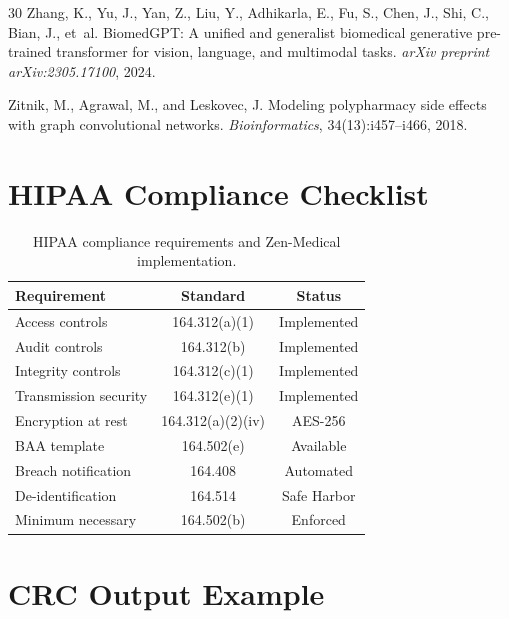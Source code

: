 \documentclass[11pt,a4paper]{article}
\begin{document}
\begin{thebibliography}{30}
Zhang, K., Yu, J., Yan, Z., Liu, Y., Adhikarla, E., Fu, S., Chen, J., Shi, C., Bian, J., et~al.
\newblock BiomedGPT: A unified and generalist biomedical generative pre-trained transformer for vision, language, and multimodal tasks.
\newblock \emph{arXiv preprint arXiv:2305.17100}, 2024.

Zitnik, M., Agrawal, M., and Leskovec, J.
\newblock Modeling polypharmacy side effects with graph convolutional networks.
\newblock \emph{Bioinformatics}, 34(13):i457--i466, 2018.

\end{thebibliography}

\appendix

\section{HIPAA Compliance Checklist}
\label{app:hipaa}

\begin{table}[h]
\centering
\caption{HIPAA compliance requirements and Zen-Medical implementation.}
\label{tab:hipaa}
\begin{tabular}{lcc}
\toprule
\textbf{Requirement} & \textbf{Standard} & \textbf{Status} \\
\midrule
Access controls & 164.312(a)(1) & Implemented \\
Audit controls & 164.312(b) & Implemented \\
Integrity controls & 164.312(c)(1) & Implemented \\
Transmission security & 164.312(e)(1) & Implemented \\
Encryption at rest & 164.312(a)(2)(iv) & AES-256 \\
BAA template & 164.502(e) & Available \\
Breach notification & 164.408 & Automated \\
De-identification & 164.514 & Safe Harbor \\
Minimum necessary & 164.502(b) & Enforced \\
\bottomrule
\end{tabular}
\end{table}

\section{CRC Output Example}
\label{app:example}
\end{document}
